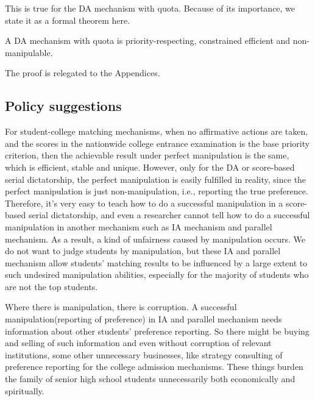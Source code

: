 This is true for the DA mechanism with quota.
Because of its importance, we state it as a formal theorem here.

\begin{thm}
A DA mechanism with quota is priority-respecting, constrained efficient and non-manipulable.
\end{thm}

The proof is relegated to the Appendices.

\subsection{Policy suggestions}

For student-college matching mechanisms, when no affirmative actions are taken, and the scores in the nationwide college entrance examination is the base priority criterion, then the achievable result under perfect
manipulation is the same, which is efficient, stable and
unique. However, only for the DA or score-based serial dictatorship,
the perfect manipulation is easily fulfilled in reality, since the
perfect manipulation is just non-manipulation, i.e., reporting the
true preference. Therefore, it's very easy to teach how to do a
successful manipulation in a score-based serial dictatorship, and even
a researcher cannot tell how to do a successful manipulation in
another mechanism such as IA mechanism and parallel mechanism. As a
result, a kind of unfairness caused by manipulation occurs. We do not
want to judge students by manipulation, but these IA and parallel
mechanism allow students' matching results to be influenced by a large
extent to such undesired manipulation abilities, especially for the
majority of students
who are not the top students. 

Where there is manipulation, there is
corruption. A successful manipulation(reporting of preference) in IA
and parallel mechanism needs information about other students'
preference reporting. So there might be buying and selling of such
information and even without corruption of relevant institutions, some
other unnecessary  businesses, like strategy
consulting of preference  reporting  for  the college admission
mechanisms.  These things  burden the family
of senior high school students unnecessarily both economically and
spiritually.




 